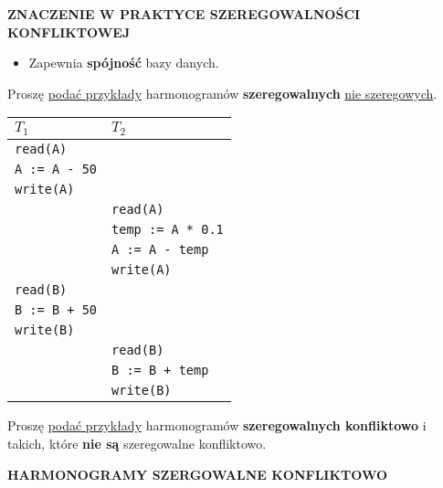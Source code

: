 \textbf{ZNACZENIE W PRAKTYCE SZEREGOWALNOŚCI KONFLIKTOWEJ}
\begin{itemize}
    \item Zapewnia \textbf{spójność} bazy danych.
\end{itemize}

\pagebreak

\horrule{0.5pt}
Proszę \underline{podać przykłady} harmonogramów \textbf{szeregowalnych}
\underline{nie szeregowych}.\\
\horrule{0.5pt}

\begin{center}
    \begin{tabular}{|p{4cm}|p{4cm}|}
        \hline
        \textbf{$T_1$} & \textbf{$T_2$} \\
        \hline
        \texttt{read(A)} & \texttt{}\\
        \texttt{A := A - 50} & \texttt{}\\
        \texttt{write(A)} & \texttt{}\\
        \texttt{} & \texttt{read(A)}\\
        \texttt{} & \texttt{temp := A * 0.1}\\
        \texttt{} & \texttt{A := A - temp}\\
        \texttt{} & \texttt{write(A)}\\
        \texttt{read(B)} & \texttt{}\\
        \texttt{B := B + 50} & \texttt{}\\
        \texttt{write(B)} & \texttt{}\\
        \texttt{} & \texttt{read(B)}\\
        \texttt{} & \texttt{B := B + temp}\\
        \texttt{} & \texttt{write(B)}\\
        \hline
    \end{tabular}
\end{center}

\pagebreak

\horrule{0.5pt}
Proszę \underline{podać przykłady} harmonogramów
\textbf{szeregowalnych konfliktowo} i takich, które \textbf{nie są}
szeregowalne konfliktowo.\\
\horrule{0.5pt}

\textbf{HARMONOGRAMY SZERGOWALNE KONFLIKTOWO}

